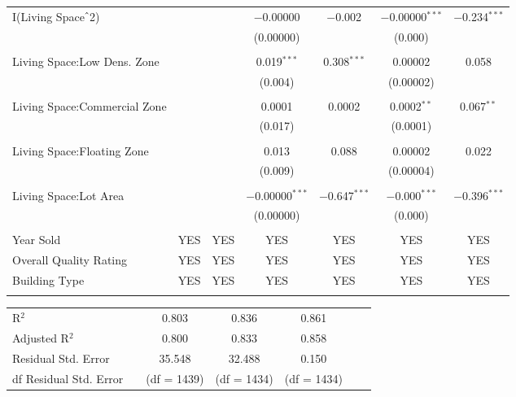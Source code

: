 \documentclass[a4paper]{article}
\begin{document}
\begin{table}[!htbp]
\begin{adjustwidth}{0.5cm}{-0cm}
\begin{threeparttable}
\begin{tabular}{@{\extracolsep{-7pt}}lcccccc}
 I(Living Space$\hat{\mkern6mu}$2) &  &  & $-$0.00000 & $-$0.002 & $-$0.00000$^{***}$ & $-$0.234$^{***}$ \\ 
  &  &  & (0.00000) &  & (0.000) &  \\ 
  & & & & & & \\ 
 Living Space:Low Dens. Zone &  &  & 0.019$^{***}$ & 0.308$^{***}$ & 0.00002 & 0.058 \\ 
  &  &  & (0.004) & & (0.00002) &  \\ 
  & & & & & & \\ 
 Living Space:Commercial Zone &  &  & 0.0001 & 0.0002 & 0.0002$^{**}$ & 0.067$^{**}$ \\ 
  &  &  & (0.017) & & (0.0001) & \\ 
  & & & & & & \\ 
 Living Space:Floating Zone &  &  & 0.013 & 0.088 & 0.00002 & 0.022 \\ 
  &  &  & (0.009) &  & (0.00004) & \\ 
  & & & & & & \\ 
 Living Space:Lot Area &  &  & $-$0.00000$^{***}$ & $-$0.647$^{***}$ & $-$0.000$^{***}$ & $-$0.396$^{***}$ \\ 
  &  &  & (0.00000) &  & (0.000) &  \\ 
  & & & & & & \\ 
  Year Sold & YES & YES & YES & YES & YES & YES \\ 
  Overall Quality Rating & YES & YES & YES & YES & YES & YES \\  
  Building Type & YES & YES & YES & YES & YES & YES \\ 
\hline \\[-1.8ex]  
\end{tabular} 
\small 
\centering
\begin{tabular}{@{\extracolsep{19pt}}lcccccc} 
R$^{2}$ && 0.803 &   0.836 &  0.861   \\ 
Adjusted R$^{2}$ && 0.800 &  0.833 &   0.858  \\ 
Residual Std. Error && 35.548  & 32.488  & 0.150   \\ 
df Residual Std. Error && (df = 1439)  & (df = 1434) & (df = 1434)\\

\end{tabular}
\end{threeparttable}
\end{adjustwidth}
\end{table}
\end{document}
